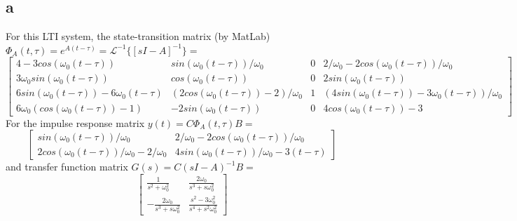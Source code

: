 \documentclass{article}
\begin{document}
\subsection{a}
For this LTI system, the state-transition matrix (by MatLab) $\Phi_A(t,\tau) = e^{A(t-\tau)} = \mathcal{L}^{-1}\{[s I-A]^{-1}\} = $
$$\left[
 \begin{matrix}
   4-3 cos(\omega_0 (t-\tau)) & sin(\omega_0 (t-\tau)) / \omega_0 & 0 & 2/\omega_0 - 2 cos(\omega_0 (t-\tau))/ \omega_0 \\
   3\omega_0 sin(\omega_0 (t-\tau)) & cos(\omega_0 (t-\tau)) & 0 & 2 sin(\omega_0 (t-\tau)) \\
   6sin(\omega_0(t - \tau)) - 6\omega_0(t-\tau) & (2cos(\omega_0(t - \tau)) - 2)/\omega_0& 1& (4sin(\omega_0(t - \tau)) - 3 \omega_0 (t-\tau))/\omega_0\\
    6\omega_0(cos(\omega_0(t - \tau)) - 1)& -2sin(\omega_0(t - \tau))& 0&4cos(\omega_0(t - \tau)) - 3
  \end{matrix}
  \right]$$
For the impulse response matrix $y(t) = C \Phi_A (t,\tau) B =$
$$\left[
  \begin{matrix}
  sin(\omega_0 (t-\tau))/\omega_0 & 2/\omega_0 - 2 cos(\omega_0 (t-\tau))/\omega_0 \\
  2 cos(\omega_0 (t-\tau))/\omega_0 - 2/\omega_0 & 4 sin(\omega_0 (t-\tau))/\omega_0 - 3(t-\tau)
  \end{matrix}
  \right]$$
and transfer function matrix $G(s) = C (s I - A)^{-1} B =$ $$\left[
  \begin{matrix}
  \frac{1}{s^2 + \omega_0^2} & \frac{2\omega_0}{s^3+s\omega_0^2} \\
  -\frac{2\omega_0}{s^3 + s\omega_0^2}& \frac{s^2 - 3\omega_0^2}{s^4 + s^2\omega_0^2}
  \end{matrix}
  \right]$$
\end{document}
